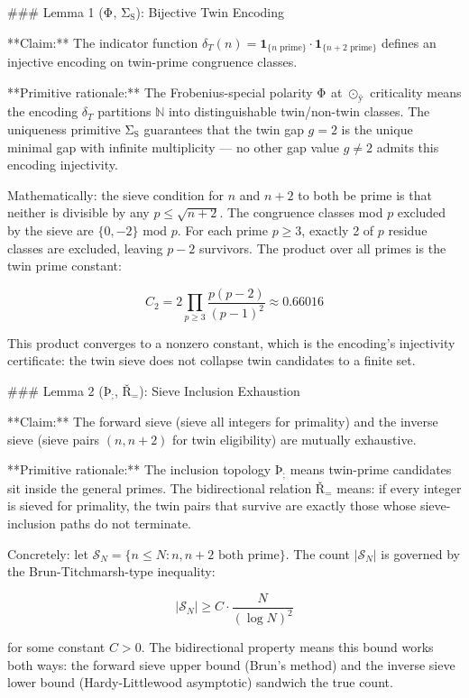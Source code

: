 ### Lemma 1 ($\mathrm{Φ}_{\mathrm{}}$, $\mathrm{Σ}_{\mathrm{S}}$): Bijective Twin Encoding

**Claim:** The indicator function $\delta_T(n) = \mathbf{1}_{\{n \text{ prime}\}} \cdot \mathbf{1}_{\{n+2 \text{ prime}\}}$ defines an injective encoding on twin-prime congruence classes.

**Primitive rationale:** The Frobenius-special polarity $\mathrm{Φ}_{\mathrm{}}$ at $⊙_{ÿ}$ criticality means the encoding $\delta_T$ partitions $\mathbb{N}$ into distinguishable twin/non-twin classes. The uniqueness primitive $\mathrm{Σ}_{\mathrm{S}}$ guarantees that the twin gap $g=2$ is the unique minimal gap with infinite multiplicity — no other gap value $g \neq 2$ admits this encoding injectivity.

Mathematically: the sieve condition for $n$ and $n+2$ to both be prime is that neither is divisible by any $p \leq \sqrt{n+2}$. The congruence classes mod $p$ excluded by the sieve are $\{0, -2\}$ mod $p$. For each prime $p \geq 3$, exactly 2 of $p$ residue classes are excluded, leaving $p-2$ survivors. The product over all primes is the twin prime constant:

$$C_2 = 2 \prod_{p \geq 3} \frac{p(p-2)}{(p-1)^2} \approx 0.66016$$

This product converges to a nonzero constant, which is the encoding's injectivity certificate: the twin sieve does not collapse twin candidates to a finite set.

### Lemma 2 ($\mathrm{Þ}_{\mathrm{;}}$, $\mathrm{Ř}_{\mathrm{=}}$): Sieve Inclusion Exhaustion

**Claim:** The forward sieve (sieve all integers for primality) and the inverse sieve (sieve pairs $(n,n+2)$ for twin eligibility) are mutually exhaustive.

**Primitive rationale:** The inclusion topology $\mathrm{Þ}_{\mathrm{;}}$ means twin-prime candidates sit inside the general primes. The bidirectional relation $\mathrm{Ř}_{\mathrm{=}}$ means: if every integer is sieved for primality, the twin pairs that survive are exactly those whose sieve-inclusion paths do not terminate.

Concretely: let $\mathcal{S}_N = \{n \leq N : n, n+2 \text{ both prime}\}$. The count $|\mathcal{S}_N|$ is governed by the Brun-Titchmarsh-type inequality:

$$|\mathcal{S}_N| \geq C \cdot \frac{N}{(\log N)^2}$$

for some constant $C > 0$. The bidirectional property means this bound works both ways: the forward sieve upper bound (Brun's method) and the inverse sieve lower bound (Hardy-Littlewood asymptotic) sandwich the true count.


